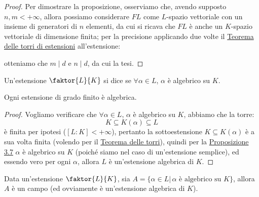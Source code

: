 \documentclass[11pt]{scrartcl}
\begin{document}
\begin{proof}
Per dimostrare la proposizione, osserviamo che, avendo supposto $n,m < +\infty$, allora possiamo considerare $FL$ come $L$-spazio vettoriale con un insieme di generatori di $n$ elementi,
da cui si ricava che $FL$ è anche un $K$-spazio vettoriale di dimensione finita; per la precisione applicando due volte il \hyperref[torri]{Teorema delle torri di estensioni} all'estensione:
\begin{center}
\end{center}
otteniamo che $m \mid d$ e $n \mid d$, da cui la tesi.
\end{proof}

\begin{definition}
    Un'estensione $\faktor{L}{K}$ si dice  se $\forall \alpha \in L$, $\alpha$ è algebrico su $K$.
\end{definition}

\begin{proposition}
    \label{3.11}
    Ogni estensione di grado finito è algebrica.
\end{proposition}

\begin{proof}
    Vogliamo verificare che $\forall \alpha \in L$, $\alpha$ è algebrico su $K$, abbiamo che la torre:
    \[ K \subseteq K(\alpha) \subseteq L
        \]
    è finita per ipotesi ($[L : K] < +\infty$), pertanto la sottoestensione $K \subseteq K(\alpha)$ è a sua volta finita (volendo per il \hyperref[torri]{Teorema delle torri}),
    quindi per la \hyperref[3.7]{Proposizione 3.7} $\alpha$ è algebrico su $K$ (poiché siamo nel caso di un'estensione semplice), ed essendo vero per ogni $\alpha$, allora $L$ è un'estensione algebrica di $K$.
\end{proof}

\begin{proposition}
    \label{3.12}
    Data un'estensione $\faktor{L}{K}$, sia $A = \{\alpha \in L | \, \text{$\alpha$ è algebrico su $K$}\}$, allora $A$ è un campo (ed ovviamente
    è un'estensione algebrica di $K$).
\end{proposition}
\end{document}
